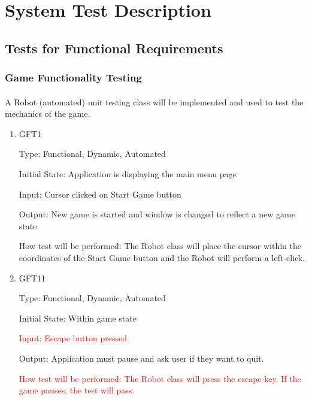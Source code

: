 \documentclass[12pt, titlepage]{article}
\begin{document}
\section{System Test Description}
	
\subsection{Tests for Functional Requirements}

\subsubsection{Game Functionality Testing}
		
\paragraph{}
A Robot (automated) unit testing class will be implemented and used to test the mechanics of the game.

\begin{enumerate}

\item{GFT1\\}

Type: Functional, Dynamic, Automated
					
Initial State: Application is displaying the main menu page
					
Input: Cursor clicked on Start Game button
					
Output: New game is started and window is changed to reflect a new game state
					
How test will be performed: The Robot class will place the cursor within the coordinates of the Start Game button and the Robot will perform a left-click.

\item{GFT11\\}

Type: Functional, Dynamic, Automated
					
Initial State: Within game state
					
\textcolor{red}{Input: Escape button pressed}
					
Output: Application must pause and ask user if they want to quit.

\textcolor{red}{How test will be performed: The Robot class will press the escape key. If the game pauses, the test will pass.}

\end{enumerate}
\end{document}
